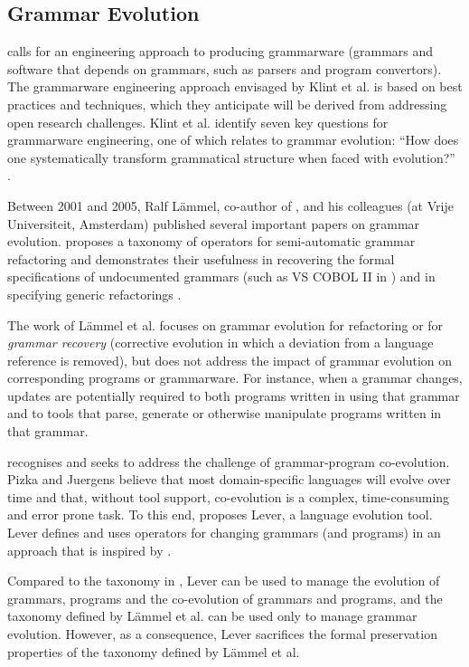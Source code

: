 \subsection{Grammar Evolution}
\cite{klint03grammarware} calls for an engineering approach to producing grammarware (grammars and software that depends on grammars, such as parsers and program convertors). The grammarware engineering approach envisaged by Klint et al. is based on best practices and techniques, which they anticipate will be derived from addressing open research challenges. Klint et al. identify seven key questions for grammarware engineering, one of which relates to grammar evolution: ``How does one systematically transform grammatical structure when faced with evolution?'' \cite[pg334]{klint03grammarware}.

Between 2001 and 2005, Ralf L\"{a}mmel, co-author of \cite{klint03grammarware}, and his colleagues (at Vrije Universiteit, Amsterdam) published several important papers on grammar evolution. \cite{lammel01grammar_adaptation} proposes a taxonomy of operators for semi-automatic grammar refactoring and demonstrates their usefulness in recovering the formal specifications of undocumented grammars (such as VS COBOL II in \cite{lammel01semiautomatic}) and in specifying generic refactorings \cite{lammel02towards}. 

The work of L\"{a}mmel et al. focuses on grammar evolution for refactoring or for \emph{grammar recovery} (corrective evolution in which a deviation from a language reference is removed), but does not address the impact of grammar evolution on corresponding programs or grammarware. For instance, when a grammar changes, updates are potentially required to both programs written in using that grammar and to tools that parse, generate or otherwise manipulate programs written in that grammar.

\cite{pizka07automating} recognises and seeks to address the challenge of grammar-program co-evolution. Pizka and Juergens believe that most domain-specific languages will evolve over time and that, without tool support, co-evolution is a complex, time-consuming and error prone task. To this end, \cite{pizka07automating} proposes Lever, a language evolution tool. Lever defines and uses operators for changing grammars (and programs) in an approach that is inspired by \cite{lammel01grammar_adaptation}.

Compared to the taxonomy in \cite{lammel01grammar_adaptation}, Lever can be used to manage the evolution of grammars, programs and the co-evolution of grammars and programs, and the taxonomy defined by L\"{a}mmel et al. can be used only to manage grammar evolution. However, as a consequence, Lever sacrifices the formal preservation properties of the taxonomy defined by L\"{a}mmel et al.


